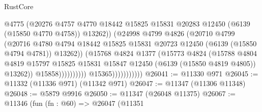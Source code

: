 \begin{lexlean}{RustCore}
\begin{coremodule}
                                            @4775
                                            (@20276
                                              @4757
                                              @4770
                                              @18442
                                              @15825
                                              @15831
                                              @20283
                                              @12450
                                              (@6139 (@15850 @4770 @4758))
                                              @13262))
                                          (@24998
                                            @4799
                                            @4826
                                            (@20710
                                              @4799
                                              (@20716
                                                @4780
                                                @4794
                                                @18442
                                                @15825
                                                @15831
                                                @20723
                                                @12450
                                                (@6139 (@15850 @4794 @4781))
                                                @13262))
                                            (@15768
                                              @4824
                                              @1377
                                              (@15773
                                                @4824
                                                (@15788
                                                  @4804
                                                  @4819
                                                  @15797
                                                  @15825
                                                  @15831
                                                  @15847
                                                  @12450
                                                  (@6139 (@15850 @4819 @4805))
                                                  @13262))
                                              @15858))))))))))
                          @15365)))))))))))
@26041 := @11330 @971
@26045 := @11332 (@11336 @971) (@11342 @971)
@26047 := @11347 (@11306 @11348)
@26048 := @5879 @9916
@26050 := @11347 (@26048 @11375)
@26067 := @11346
    (fun (fn : @60) =>
    @26047
      (@11351

\end{coremodule}
\end{lexlean}
